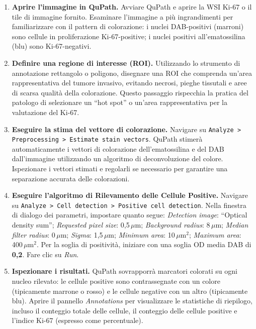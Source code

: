 \begin{enumerate}
    \item \textbf{Aprire l'immagine in QuPath.} Avviare QuPath e aprire la WSI Ki-67 o il tile di immagine fornito. Esaminare l'immagine a più ingrandimenti per familiarizzare con il pattern di colorazione: i nuclei DAB-positivi (marroni) sono cellule in proliferazione Ki-67-positive; i nuclei positivi all'ematossilina (blu) sono Ki-67-negativi.

    \item \textbf{Definire una regione di interesse (ROI).} Utilizzando lo strumento di annotazione rettangolo o poligono, disegnare una ROI che comprenda un'area rappresentativa del tumore invasivo, evitando necrosi, pieghe tissutali e aree di scarsa qualità della colorazione. Questo passaggio rispecchia la pratica del patologo di selezionare un ``hot spot'' o un'area rappresentativa per la valutazione del Ki-67.

    \item \textbf{Eseguire la stima del vettore di colorazione.} Navigare su \texttt{Analyze > Preprocessing > Estimate stain vectors}. QuPath stimerà automaticamente i vettori di colorazione dell'ematossilina e del DAB dall'immagine utilizzando un algoritmo di deconvoluzione del colore. Ispezionare i vettori stimati e regolarli se necessario per garantire una separazione accurata delle colorazioni.

    \item \textbf{Eseguire l'algoritmo di Rilevamento delle Cellule Positive.} Navigare su \texttt{Analyze > Cell detection > Positive cell detection}. Nella finestra di dialogo dei parametri, impostare quanto segue: \textit{Detection image}: ``Optical density sum''; \textit{Requested pixel size}: 0,5\,$\mu$m; \textit{Background radius}: 8\,$\mu$m; \textit{Median filter radius}: 0\,$\mu$m; \textit{Sigma}: 1,5\,$\mu$m; \textit{Minimum area}: 10\,$\mu$m$^2$; \textit{Maximum area}: 400\,$\mu$m$^2$. Per la soglia di positività, iniziare con una soglia OD media DAB di \textbf{0,2}. Fare clic su \textit{Run}.

    \item \textbf{Ispezionare i risultati.} QuPath sovrapporrà marcatori colorati su ogni nucleo rilevato: le cellule positive sono contrassegnate con un colore (tipicamente marrone o rosso) e le cellule negative con un altro (tipicamente blu). Aprire il pannello \textit{Annotations} per visualizzare le statistiche di riepilogo, incluso il conteggio totale delle cellule, il conteggio delle cellule positive e l'indice Ki-67 (espresso come percentuale).


\end{enumerate}
